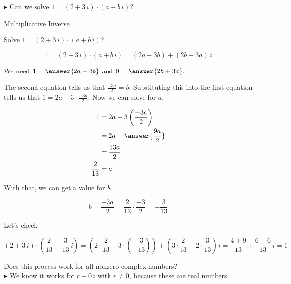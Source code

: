 \documentclass{ximera}
\begin{document}
 $\blacktriangleright$ Can we solve $1 = (2 + 3 \, i) \cdot (a + b \, i)  $?



\begin{example} Multiplicative Inverse


Solve $1 = (2 + 3 \, i) \cdot (a + b \, i)  $?


\begin{explanation}

\[   1 = (2 + 3 \, i) \cdot (a + b \, i)  =  (2a - 3b) + (2b+3a) \, i      \]






We need $1 = \answer{2a - 3b}$ and $0 = \answer{2b+3a}$.


The second  equation tells us that $\frac{-3a}{2} = b$.  Substituting this into the first equation tells us that $1 = 2a - 3 \cdot \frac{-3a}{2}$.  Now we can solve for $a$.



\begin{align*}
1     & = 2a - 3 \left( \frac{-3a}{2} \right)  \\
      & =   2a + \answer{\frac{9a}{2}}   \\
      & =    \frac{13a}{2}   \\
  \frac{2}{13}    & =  a
\end{align*}




With that, we can get a value for $b$.   


\[ b = \frac{-3a}{2} = \frac{2}{13}  \cdot \frac{-3}{2} = -\frac{3}{13} \]

Let's check:



\[    (2 + 3 \, i) \cdot \left(\frac{2}{13} - \frac{3}{13} \, i \right)     =   \left( 2 \cdot  \frac{2}{13} - 3 \cdot \left(- \frac{3}{13}\right)\right)  + \left( 3 \cdot \frac{2}{13} - 2 \cdot \frac{3}{13} \right) \, i = \frac{4+9}{13} + \frac{6-6}{13} \, i = 1  \]



\end{explanation}



\end{example}


Does this process work for all nonzero complex numbers? \\


$\blacktriangleright$  We know it works for $r + 0 \, i$ with $r \ne 0$, because these are real numbers.
\end{document}
